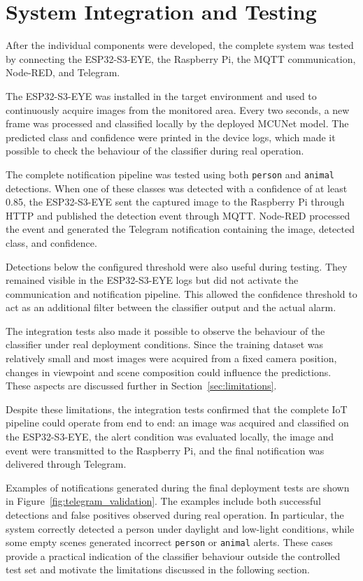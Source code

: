 \documentclass{article}
\begin{document}
\section{System Integration and Testing}
\label{sec:system-testing}

After the individual components were developed, the complete system was
tested by connecting the ESP32-S3-EYE, the Raspberry Pi, the MQTT
communication, Node-RED, and Telegram.

The ESP32-S3-EYE was installed in the target environment and used to
continuously acquire images from the monitored area. Every two seconds, a
new frame was processed and classified locally by the deployed MCUNet
model. The predicted class and confidence were printed in the device logs,
which made it possible to check the behaviour of the classifier during
real operation.

The complete notification pipeline was tested using both
\texttt{person} and \texttt{animal} detections. When one of these classes
was detected with a confidence of at least 0.85, the ESP32-S3-EYE sent the
captured image to the Raspberry Pi through HTTP and published the detection
event through MQTT. Node-RED processed the event and generated the Telegram
notification containing the image, detected class, and confidence.

Detections below the configured threshold were also useful during testing.
They remained visible in the ESP32-S3-EYE logs but did not activate the
communication and notification pipeline. This allowed the confidence
threshold to act as an additional filter between the classifier output and
the actual alarm.

The integration tests also made it possible to observe the behaviour of the
classifier under real deployment conditions. Since the training dataset was
relatively small and most images were acquired from a fixed camera position,
changes in viewpoint and scene composition could influence the predictions.
These aspects are discussed further in Section~\ref{sec:limitations}.

Despite these limitations, the integration tests confirmed that the complete
IoT pipeline could operate from end to end: an image was acquired and
classified on the ESP32-S3-EYE, the alert condition was evaluated locally,
the image and event were transmitted to the Raspberry Pi, and the final
notification was delivered through Telegram.

Examples of notifications generated during the final deployment tests are
shown in Figure~\ref{fig:telegram_validation}. The examples include both
successful detections and false positives observed during real operation.
In particular, the system correctly detected a person under daylight and
low-light conditions, while some empty scenes generated incorrect
\texttt{person} or \texttt{animal} alerts. These cases provide a practical
indication of the classifier behaviour outside the controlled test set and
motivate the limitations discussed in the following section.
\end{document}
